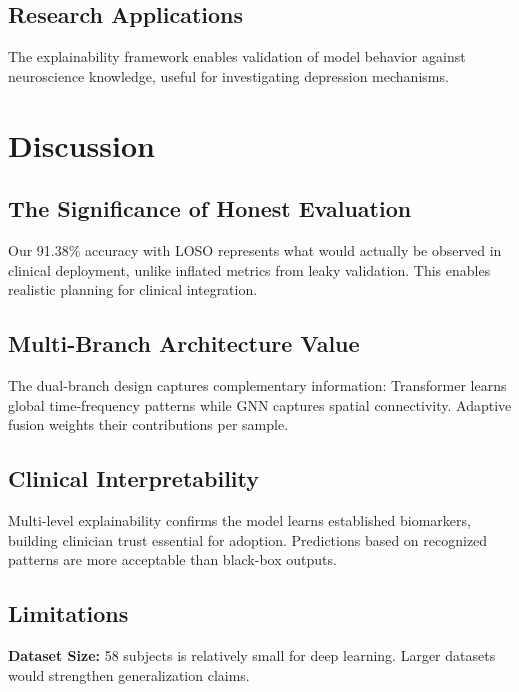 \documentclass[blue,fullpaper]{ludusofficial}  %
\begin{document}
\subsection{Research Applications}

The explainability framework enables validation of model behavior against neuroscience knowledge, useful for investigating depression mechanisms.

\section{Discussion}

\subsection{The Significance of Honest Evaluation}

Our 91.38\% accuracy with LOSO represents what would actually be observed in clinical deployment, unlike inflated metrics from leaky validation. This enables realistic planning for clinical integration.

\subsection{Multi-Branch Architecture Value}

The dual-branch design captures complementary information: Transformer learns global time-frequency patterns while GNN captures spatial connectivity. Adaptive fusion weights their contributions per sample.

\subsection{Clinical Interpretability}

Multi-level explainability confirms the model learns established biomarkers, building clinician trust essential for adoption. Predictions based on recognized patterns are more acceptable than black-box outputs.

\subsection{Limitations}

\textbf{Dataset Size:} 58 subjects is relatively small for deep learning. Larger datasets would strengthen generalization claims.
\end{document}
